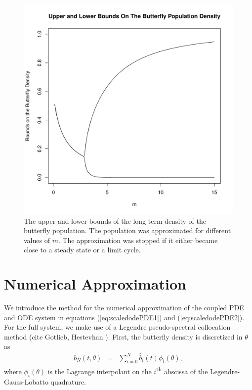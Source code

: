 \documentclass[12pt]{article}
\begin{document}
\begin{figure}[htb]
  \centering
  \includegraphics[width=12cm]{ODEButterflyBounds.pdf}
  \caption[Upper and lower bounds of the butterfly density.]{The upper
    and lower bounds of the long term density of the butterfly
    population. The population was approximated for different values
    of $m$. The approximation was stopped if it either became close to
    a steady state or a limit cycle.}
  \label{fig:odeButterflyBifurcation}
\end{figure}

\section{Numerical Approximation}

We introduce the method for the numerical approximation of the coupled
PDE and ODE system in equations (\ref{eq:scaledodePDE1}) and
(\ref{eq:scaledodePDE2}). For the full system, we make use of a
Legendre pseudo-spectral collocation method\cite{spectralMethodsFluids} (cite Gotlieb,
Hestevhan ). First, the butterfly density is discretized in $\theta$
as
\begin{eqnarray}
  \label{eqn:spatialDiscretization}
  b_N(t,\theta) & = & \sum^N_{i=0} \hat{b}_i(t) \phi_i(\theta),
\end{eqnarray}
where $\phi_i(\theta)$ is the Lagrange interpolant on the
$i$\textsuperscript{th} abscissa of the Legendre-Gauss-Lobatto
quadrature.
\end{document}
